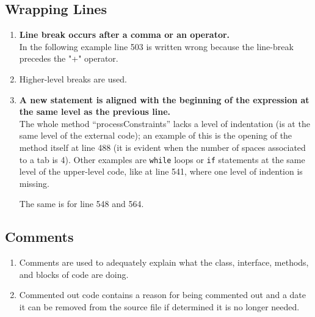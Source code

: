 \documentclass[a4paper,11pt]{report} %
\begin{document}
		\subsection*{Wrapping Lines}\begin{enumerate}[resume]
			\item \textbf{Line break occurs after a comma or an operator.}\smallskip \\
				In the following example line 503 is written wrong because the line-break precedes the "+" operator.
				
			\item Higher-level breaks are used.
			\item \textbf{A new statement is aligned with the beginning of the expression at the same level as the previous line.}\smallskip \\
				The whole method ``processConstraints'' lacks a level of indentation (is at the same level of the external code); an example of this is the opening of the method itself at line 488 (it is evident when the number of spaces associated to a tab is 4).
				 \pagebreak
				Other examples are \texttt{while} loops or \texttt{if} statements at the same level of the upper-level code, like at line 541, where one level of indention is missing.
				
				The same is for line 548 and 564.
		\end{enumerate}
		
		\subsection*{Comments}\begin{enumerate}[resume]
			\item Comments are used to adequately explain what the class, interface, methods, and blocks of code are doing.
			\item Commented out code contains a reason for being commented out and a date it can be removed from the source file if determined it is no longer needed.
		\end{enumerate}
		
\end{document}
